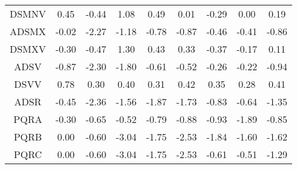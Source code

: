 \documentclass[11pt,a4paper]{report}
\begin{document}
\begin{longtable}{ | c || c | c | c | c | c | c | c || c |}
DSMNV &  \cellcolor[HTML]{F7F7FF} 0.45 &  \cellcolor[HTML]{FFF7F7} -0.44 &  \cellcolor[HTML]{E7E7FF} 1.08 &  \cellcolor[HTML]{EFEFFF} 0.49 &  \cellcolor[HTML]{FFFFFF} 0.01 &  \cellcolor[HTML]{FFF7F7} -0.29 &  \cellcolor[HTML]{FFFFFF} 0.00 &  \cellcolor[HTML]{F7F7FF} 0.19 \\
ADSMX &  \cellcolor[HTML]{FFFFFF} -0.02 &  \cellcolor[HTML]{FFC7C7} -2.27 &  \cellcolor[HTML]{FFDFDF} -1.18 &  \cellcolor[HTML]{FFEFEF} -0.78 &  \cellcolor[HTML]{FFE7E7} -0.87 &  \cellcolor[HTML]{FFF7F7} -0.46 &  \cellcolor[HTML]{FFF7F7} -0.41 &  \cellcolor[HTML]{FFE7E7} -0.86 \\
DSMXV &  \cellcolor[HTML]{FFF7F7} -0.30 &  \cellcolor[HTML]{FFF7F7} -0.47 &  \cellcolor[HTML]{DFDFFF} 1.30 &  \cellcolor[HTML]{F7F7FF} 0.43 &  \cellcolor[HTML]{F7F7FF} 0.33 &  \cellcolor[HTML]{FFF7F7} -0.37 &  \cellcolor[HTML]{FFF7F7} -0.17 &  \cellcolor[HTML]{FFFFFF} 0.11 \\
ADSV &  \cellcolor[HTML]{FFE7E7} -0.87 &  \cellcolor[HTML]{FFC7C7} -2.30 &  \cellcolor[HTML]{FFCFCF} -1.80 &  \cellcolor[HTML]{FFEFEF} -0.61 &  \cellcolor[HTML]{FFEFEF} -0.52 &  \cellcolor[HTML]{FFF7F7} -0.26 &  \cellcolor[HTML]{FFF7F7} -0.22 &  \cellcolor[HTML]{FFE7E7} -0.94 \\
DSVV &  \cellcolor[HTML]{EFEFFF} 0.78 &  \cellcolor[HTML]{F7F7FF} 0.30 &  \cellcolor[HTML]{F7F7FF} 0.40 &  \cellcolor[HTML]{F7F7FF} 0.31 &  \cellcolor[HTML]{F7F7FF} 0.42 &  \cellcolor[HTML]{F7F7FF} 0.35 &  \cellcolor[HTML]{F7F7FF} 0.28 &  \cellcolor[HTML]{F7F7FF} 0.41 \\
ADSR &  \cellcolor[HTML]{FFF7F7} -0.45 &  \cellcolor[HTML]{FFC7C7} -2.36 &  \cellcolor[HTML]{FFD7D7} -1.56 &  \cellcolor[HTML]{FFCFCF} -1.87 &  \cellcolor[HTML]{FFD7D7} -1.73 &  \cellcolor[HTML]{FFE7E7} -0.83 &  \cellcolor[HTML]{FFEFEF} -0.64 &  \cellcolor[HTML]{FFDFDF} -1.35 \\
PQRA &  \cellcolor[HTML]{FFF7F7} -0.30 &  \cellcolor[HTML]{FFEFEF} -0.65 &  \cellcolor[HTML]{FFEFEF} -0.52 &  \cellcolor[HTML]{FFEFEF} -0.79 &  \cellcolor[HTML]{FFE7E7} -0.88 &  \cellcolor[HTML]{FFE7E7} -0.93 &  \cellcolor[HTML]{FFCFCF} -1.89 &  \cellcolor[HTML]{FFE7E7} -0.85 \\
PQRB &  \cellcolor[HTML]{FFFFFF} 0.00 &  \cellcolor[HTML]{FFEFEF} -0.60 &  \cellcolor[HTML]{FFAFAF} -3.04 &  \cellcolor[HTML]{FFCFCF} -1.75 &  \cellcolor[HTML]{FFBFBF} -2.53 &  \cellcolor[HTML]{FFCFCF} -1.84 &  \cellcolor[HTML]{FFD7D7} -1.60 &  \cellcolor[HTML]{FFD7D7} -1.62 \\
PQRC &  \cellcolor[HTML]{FFFFFF} 0.00 &  \cellcolor[HTML]{FFEFEF} -0.60 &  \cellcolor[HTML]{FFAFAF} -3.04 &  \cellcolor[HTML]{FFCFCF} -1.75 &  \cellcolor[HTML]{FFBFBF} -2.53 &  \cellcolor[HTML]{FFEFEF} -0.61 &  \cellcolor[HTML]{FFEFEF} -0.51 &  \cellcolor[HTML]{FFDFDF} -1.29 \\

\end{longtable}
\end{document}
